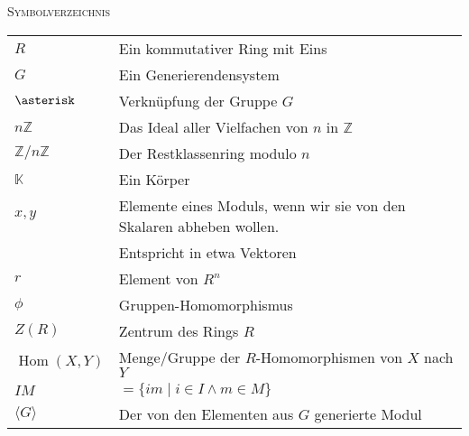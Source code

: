 \documentclass[a4paper]{amsart}
\theoremstyle{definition}
\DeclareMathOperator{\Hom}{Hom}
\newcommand{\Z}{\ensuremath{\mathbb{ Z }}}
\newcommand{\K}{\ensuremath{\mathbb{ K }}}
\newcommand{\zz}[1]{\ensuremath{\Z /#1\Z}}
\begin{document}
\begin{large}
    \centerline{\textsc{Symbolverzeichnis}}
\end{large}
\bigskip

\renewcommand*{\arraystretch}{1}

\begin{tabular}{ll}
    $R$                                 & Ein kommutativer Ring mit Eins\\
    $G$                                 & Ein Generierendensystem\\
    $\asterisk$                         & Verknüpfung der Gruppe $G$\\
    $n\Z$                               & Das Ideal aller Vielfachen von $n$ in $\Z$\\
    $\zz{n}$                            & Der Restklassenring modulo $n$\\
    $\K$                                & Ein Körper\\
    $x, y$                    & Elemente eines Moduls, wenn wir sie von den Skalaren abheben wollen. \\
                                        & Entspricht in etwa Vektoren\\
    $r$                            & Element von $R^n$\\
    $\phi$                              & Gruppen-Homomorphismus\\
    $Z(R)$                              & Zentrum des Rings $R$\\
    $\Hom(X,Y)$                         & Menge/Gruppe der $R$-Homomorphismen von $X$ nach $Y$\\
    $IM$                                & $= \{ im \mid i \in I \land m\in M \}$\\
    $\langle G \rangle$                 & Der von den Elementen aus $G$ generierte Modul
    
\end{tabular}
\end{document}
